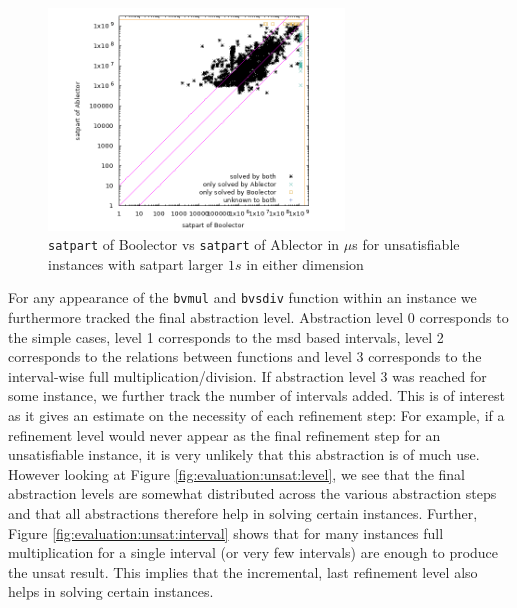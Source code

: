 \begin{figure}[]
    \centering
        \includegraphics[width=0.7\textwidth]{plots/unsat/Boolector-vs-Ablector-satpart-big.png}
    \caption{\texttt{satpart} of Boolector vs \texttt{satpart} of Ablector in $\mu$s for unsatisfiable instances with satpart larger $1s$ in either dimension}
    \label{fig:evaluation:unsat:scatter-big}
\end{figure}
For any appearance of the \texttt{bvmul} and \texttt{bvsdiv} function within an instance we furthermore tracked the final abstraction level. Abstraction level 0 corresponds to the simple cases, level 1 corresponds to the msd based intervals, level 2 corresponds to the relations between functions and level 3 corresponds to the interval-wise full multiplication/division. If abstraction level 3 was reached for some instance, we further track the number of intervals added. This is of interest as it gives an estimate on the necessity of each refinement step: For example, if a refinement level would never appear as the final refinement step for an unsatisfiable instance, it is very unlikely that this abstraction is of much use. However looking at Figure \ref{fig:evaluation:unsat:level}, we see that the final abstraction levels are somewhat distributed across the various abstraction steps and that all abstractions therefore help in solving certain instances.
Further, Figure \ref{fig:evaluation:unsat:interval} shows that for many instances full multiplication for a single interval (or very few intervals) are enough to produce the unsat result. This implies that the incremental, last refinement level also helps in solving certain instances.

